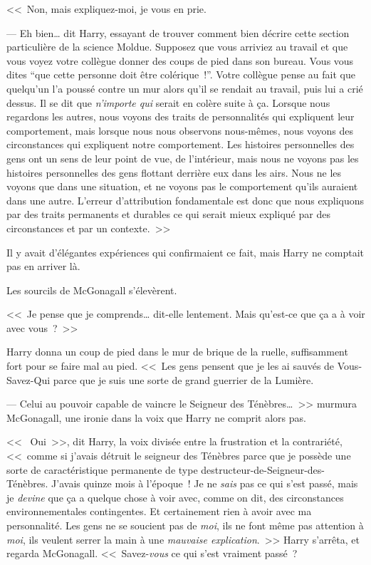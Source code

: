 <<~Non, mais expliquez-moi, je vous en prie.

--- Eh bien… dit Harry, essayant de trouver comment bien décrire cette section particulière de la science Moldue. Supposez que vous arriviez au travail et que vous voyez votre collègue donner des coups de pied dans son bureau. Vous vous dites “que cette personne doit être colérique~!”. Votre collègue pense au fait que quelqu'un l'a poussé contre un mur alors qu'il se rendait au travail, puis lui a crié dessus. Il se dit que \emph{n'importe qui} serait en colère suite à ça. Lorsque nous regardons les autres, nous voyons des traits de personnalités qui expliquent leur comportement, mais lorsque nous nous observons nous-mêmes, nous voyons des circonstances qui expliquent notre comportement. Les histoires personnelles des gens ont un sens de leur point de vue, de l'intérieur, mais nous ne voyons pas les histoires personnelles des gens flottant derrière eux dans les airs. Nous ne les voyons que dans une situation, et ne voyons pas le comportement qu'ils auraient dans une autre. L'erreur d'attribution fondamentale est donc que nous expliquons par des traits permanents et durables ce qui serait mieux expliqué par des circonstances et par un contexte.~>>

Il y avait d'élégantes expériences qui confirmaient ce fait, mais Harry ne comptait pas en arriver là.

Les sourcils de McGonagall s'élevèrent.

<<~Je pense que je comprends… dit-elle lentement. Mais qu'est-ce que ça a à voir avec vous~?~>>

Harry donna un coup de pied dans le mur de brique de la ruelle, suffisamment fort pour se faire mal au pied.
<<~Les gens pensent que je les ai sauvés de Vous-Savez-Qui parce que je suis une sorte de grand guerrier de la Lumière.

--- Celui au pouvoir capable de vaincre le Seigneur des Ténèbres…~>> murmura McGonagall, une ironie dans la voix que Harry ne comprit alors pas.

<<~ Oui~>>, dit Harry, la voix divisée entre la frustration et la contrariété, <<~comme si j'avais détruit le seigneur des Ténèbres parce que je possède une sorte de caractéristique permanente de type destructeur-de-Seigneur-des-Ténèbres. J'avais quinze mois à l'époque~! Je ne \emph{sais} pas ce qui s'est passé, mais je \emph{devine} que ça a quelque chose à voir avec, comme on dit, des circonstances environnementales contingentes. Et certainement rien à avoir avec ma personnalité. Les gens ne se soucient pas de \emph{moi}, ils ne font même pas attention à \emph{moi}, ils veulent serrer la main à une \emph{mauvaise explication}.~>> Harry s'arrêta, et regarda McGonagall. <<~Savez-\emph{vous} ce qui s'est vraiment passé~?

